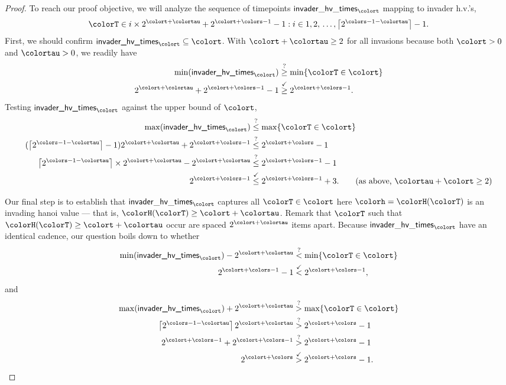 \begin{proof}
To reach our proof objective, we will analyze the sequence of timepoints $\mathsf{invader\_hv\_times}_{\colort}$ mapping to invader h.v.'s,
\begin{align*}
\colorT \in i \times 2^{\colort + \colortau} +
2^{\colort + \colors - 1} - 1
:
i \in 1,2,\,\ldots,\left\lceil2^{\colors - 1 - \colortau}\right\rceil - 1.
\end{align*}
First, we should confirm $\textsf{invader\_hv\_times}_{\colort} \subseteq \colort$.
With $\colort + \colortau \geq 2$ for all invasions because both $\colort > 0$ and $\colortau > 0$, we readily have
\begin{align*}
\min(\textsf{invader\_hv\_times}_{\colort})
&\stackrel{?}{\geq}
\min\{\colorT \in \colort\}\\
2^{\colort + \colortau} + 2^{\colort + \colors - 1} - 1
&\stackrel{\checkmark}{\geq}
2^{\colort + \colors - 1}.
\end{align*}
Testing $\textsf{invader\_hv\_times}_{\colort}$ against the upper bound of $\colort$,
\begin{align*}
\max(\textsf{invader\_hv\_times}_{\colort})
&\stackrel{?}{\leq}
\max\{\colorT \in \colort\}
\\
(\left\lceil 2^{\colors - 1 - \colortau} \right\rceil  - 1)
2^{\colort + \colortau} + 2^{\colort + \colors - 1}
&\stackrel{?}{\leq}
2^{\colort + \colors} - 1
\\
\left\lceil 2^{\colors - 1 - \colortau} \right\rceil \times 2^{\colort + \colortau} - 2^{\colort + \colortau}
&\stackrel{?}{\leq}
2^{\colort + \colors - 1} - 1
\\
2^{\colort + \colors - 1}
&\stackrel{\checkmark}{\leq}
2^{\colort + \colors - 1} + 3.
\tag{as above, $\colortau + \colort \geq 2$}
\end{align*}

Our final step is to establish that $\mathsf{invader\_hv\_times}_{\colort}$ captures all $\colorT \in \colort$ here $\colorh = \colorH(\colorT)$ is an invading hanoi value --- that is, $\colorH(\colorT) \geq \colort + \colortau$.
Remark that $\colorT$ such that $\colorH(\colorT) \geq \colort + \colortau$ occur are spaced $2^{\colort + \colortau}$ items apart.
Because $\mathsf{invader\_hv\_times}_{\colort}$ have an identical cadence, our question boils down to whether
\begin{align*}
\min(\textsf{invader\_hv\_times}_{\colort})
- 2^{\colort + \colortau}
&\stackrel{?}{<}
\min\{\colorT \in \colort\}\\
2^{\colort + \colors - 1} - 1
&\stackrel{\checkmark}{<}
2^{\colort + \colors - 1},
\end{align*}
and
\begin{align*}
\max(\textsf{invader\_hv\_times}_{\colort})
+ 2^{\colort + \colortau}
&\stackrel{?}{>}
\max\{\colorT \in \colort\}\\
\left\lceil 2^{\colors - 1 - \colortau}\right\rceil 2^{\colort + \colortau}
&\stackrel{?}{>}
2^{\colort + \colors} - 1\\
2^{\colort + \colors - 1}
+ 2^{\colort + \colors - 1}
&\stackrel{?}{>}
2^{\colort + \colors} - 1\\
2^{\colort + \colors}
&\stackrel{\checkmark}{>}
2^{\colort + \colors} - 1.
\end{align*}


\end{proof}

